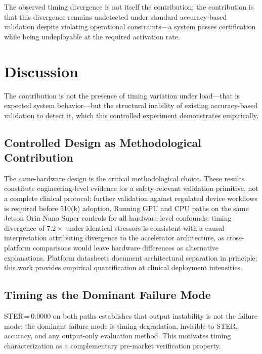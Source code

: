 \documentclass[journal,10pt,twocolumn]{IEEEtran}
\begin{document}
The observed timing divergence is not itself the contribution; the
contribution is that this divergence remains undetected under standard
accuracy-based validation despite violating operational constraints---a
system passes certification while being undeployable at the required
activation rate.

\section{Discussion}

The contribution is not the presence of timing variation under load---that
is expected system behavior---but the structural inability of existing
accuracy-based validation to detect it, which this controlled experiment
demonstrates empirically.

\subsection{Controlled Design as Methodological Contribution}

The same-hardware design is the critical methodological choice.
These results constitute engineering-level evidence for a safety-relevant
validation primitive, not a complete clinical protocol; further validation
against regulated device workflows is required before 510(k) adoption.
Running GPU and CPU paths on the same Jetson Orin Nano Super controls
for all hardware-level confounds; timing divergence of $7.2{\times}$
under identical stressors is consistent with a causal interpretation
attributing divergence to the accelerator architecture, as cross-platform
comparisons would leave hardware differences as alternative explanations.
Platform datasheets document architectural separation in principle;
this work provides empirical quantification at clinical deployment intensities.

\subsection{Timing as the Dominant Failure Mode}

STER\,=\,0.0000 on both paths establishes that output instability is
not the failure mode; the dominant failure mode is timing degradation,
invisible to STER, accuracy, and any output-only evaluation method.
This motivates timing characterization as a complementary pre-market
verification property.
\end{document}
